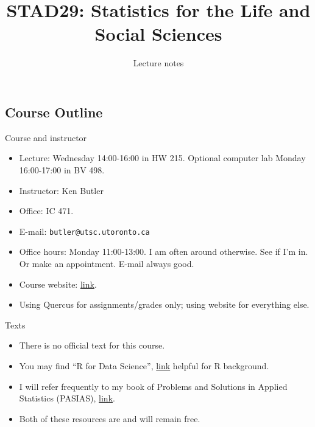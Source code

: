 \documentclass[ignorenonframetext,]{beamer}
\title{STAD29: Statistics for the Life and Social Sciences}
\author{Lecture notes}
\date{}
\begin{document}
\frame{\titlepage}

\begin{frame}

\section*{Course Outline}
\frame{\sectionpage}

\end{frame}

\begin{frame}[fragile]{Course and instructor}
\protect\hypertarget{course-and-instructor}{}

\begin{itemize}
\item
  Lecture: Wednesday 14:00-16:00 in HW 215. Optional computer lab Monday
  16:00-17:00 in BV 498.
\item
  Instructor: Ken Butler
\item
  Office: IC 471.
\item
  E-mail: \texttt{butler@utsc.utoronto.ca}
\item
  Office hours: Monday 11:00-13:00. I am often around otherwise. See if
  I'm in. Or make an appointment. E-mail always good.
\item
  Course website: \href{www.utsc.utoronto.ca/~butler/d29}{link}.
\item
  Using Quercus for assignments/grades only; using website for
  everything else.
\end{itemize}

\end{frame}

\begin{frame}{Texts}
\protect\hypertarget{texts}{}

\begin{itemize}
\item
  There is no official text for this course.
\item
  You may find ``R for Data Science'',
  \href{http://r4ds.had.co.nz/}{link} helpful for R background.
\item
  I will refer frequently to my book of Problems and Solutions in
  Applied Statistics (PASIAS),
  \href{http://ritsokiguess.site/pasias/}{link}.
\item
  Both of these resources are and will remain free.
\end{itemize}

\end{frame}
\end{document}
